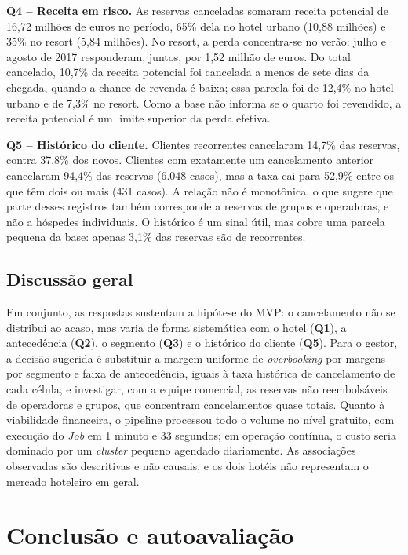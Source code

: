 \documentclass[11pt,a4paper]{article}
\newcommand{\Q}[1]{\textbf{Q#1}}
\begin{document}
\textbf{Q4 -- Receita em risco.} As reservas canceladas somaram receita potencial de 16,72 milhões de euros no período, 65\% dela no hotel urbano (10,88 milhões) e 35\% no resort (5,84 milhões). No resort, a perda concentra-se no verão: julho e agosto de 2017 responderam, juntos, por 1,52 milhão de euros. Do total cancelado, 10,7\% da receita potencial foi cancelada a menos de sete dias da chegada, quando a chance de revenda é baixa; essa parcela foi de 12,4\% no hotel urbano e de 7,3\% no resort. Como a base não informa se o quarto foi revendido, a receita potencial é um limite superior da perda efetiva.

\textbf{Q5 -- Histórico do cliente.} Clientes recorrentes cancelaram 14,7\% das reservas, contra 37,8\% dos novos. Clientes com exatamente um cancelamento anterior cancelaram 94,4\% das reservas (6.048 casos), mas a taxa cai para 52,9\% entre os que têm dois ou mais (431 casos). A relação não é monotônica, o que sugere que parte desses registros também corresponde a reservas de grupos e operadoras, e não a hóspedes individuais. O histórico é um sinal útil, mas cobre uma parcela pequena da base: apenas 3,1\% das reservas são de recorrentes.

\subsection{Discussão geral}
Em conjunto, as respostas sustentam a hipótese do MVP: o cancelamento não se distribui ao acaso, mas varia de forma sistemática com o hotel (\Q{1}), a antecedência (\Q{2}), o segmento (\Q{3}) e o histórico do cliente (\Q{5}). Para o gestor, a decisão sugerida é substituir a margem uniforme de \textit{overbooking} por margens por segmento e faixa de antecedência, iguais à taxa histórica de cancelamento de cada célula, e investigar, com a equipe comercial, as reservas não reembolsáveis de operadoras e grupos, que concentram cancelamentos quase totais. Quanto à viabilidade financeira, o pipeline processou todo o volume no nível gratuito, com execução do \textit{Job} em 1 minuto e 33 segundos; em operação contínua, o custo seria dominado por um \textit{cluster} pequeno agendado diariamente. As associações observadas são descritivas e não causais, e os dois hotéis não representam o mercado hoteleiro em geral.

\section{Conclusão e autoavaliação}\label{sec:conclusao}
\end{document}
